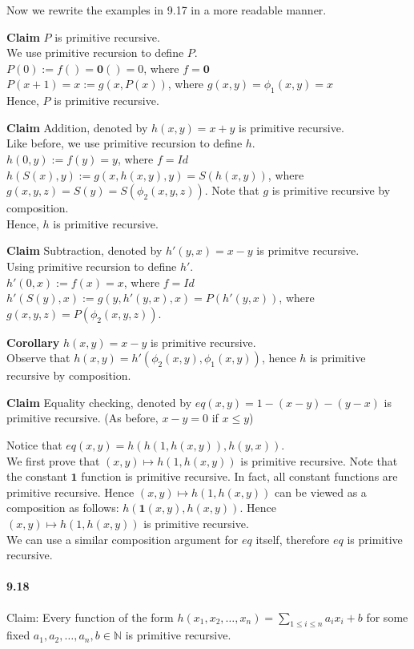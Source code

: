 \documentclass{article}
\begin{document}
Now we rewrite the examples in 9.17 in a more readable manner.

\textbf{Claim} $P$ is primitive recursive.\\
We use primitive recursion to define $P$.\\
$P(0):=f()=\mathbf{0}() = 0$, where $f=\mathbf{0}$\\
$P(x+1)=x:=g(x, P(x))$, where $g(x,y) = \phi_1(x,y)=x$\\
Hence, $P$ is primitive recursive.

\textbf{Claim} Addition, denoted by $h(x,y)=x+y$ is primitive recursive.\\
Like before, we use primitive recursion to define $h$.\\
$h(0,y):=f(y)=y$, where $f=Id$\\
$h(S(x),y):=g(x, h(x,y), y) = S(h(x,y))$, where $g(x,y,z)=S(y)=S(\phi_2(x,y,z))$. Note that $g$ is primitive recursive by composition.\\
Hence, $h$ is primitive recursive.

\textbf{Claim} Subtraction, denoted by $h'(y,x)=x-y$ is primitve recursive.\\
Using primitive recursion to define $h'$.\\
$h'(0,x):=f(x)=x$, where $f=Id$\\
$h'(S(y),x):=g(y,h'(y,x),x)=P(h'(y,x))$, where $g(x,y,z)=P(\phi_2(x,y,z))$.

\textbf{Corollary} $h(x,y)=x-y$ is primitive recursive.\\
Observe that $h(x,y)=h'(\phi_2(x,y),\phi_1(x,y))$, hence $h$ is primitive recursive by composition.


\textbf{Claim} Equality checking, denoted by $eq(x,y)=1-(x-y)-(y-x)$ is primitive recursive. (As before, $x-y=0$ if $x\leq y$)

Notice that $eq(x,y) = h(h(1, h(x,y)), h(y,x))$.\\
We first prove that $(x,y)\mapsto h(1, h(x,y))$ is primitive recursive. Note that the constant $\mathbf{1}$ function is primitive recursive. In fact, all constant functions are primitive recursive. Hence $(x,y)\mapsto h(1, h(x,y))$ can be viewed as a composition as follows: $h(\mathbf{1}(x,y), h(x,y))$. Hence $(x,y)\mapsto h(1, h(x,y))$ is primitive recursive.\\
We can use a similar composition argument for $eq$ itself, therefore $eq$ is primitive recursive.


\paragraph{9.18} Claim: Every function of the form $h(x_1,x_2,\dots,x_n)=\sum_{1\leq i\leq n}a_ix_i + b$ for some fixed $a_1,a_2,\dots,a_n,b\in \mathbb{N}$ is primitive recursive.
\end{document}

